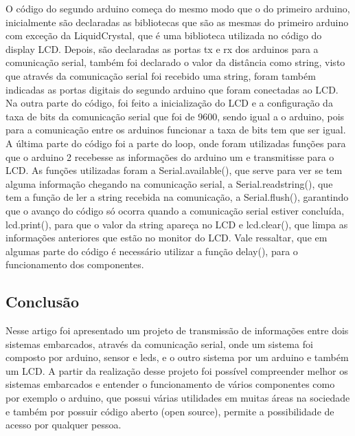 \documentclass[conference]{IEEEtran}
\begin{document}
O código do segundo arduino começa do mesmo modo que o do primeiro arduino, inicialmente são declaradas as bibliotecas que são as mesmas do primeiro arduino com exceção da 
LiquidCrystal, que é uma biblioteca utilizada no código do display LCD.
Depois, são declaradas as portas tx e rx dos arduinos para a comunicação serial, também foi declarado o valor da distância como string, visto que através
da comunicação serial foi recebido uma string, foram também indicadas as portas digitais do segundo arduino que foram conectadas ao LCD.
Na outra parte do código, foi feito a inicialização do LCD e a configuração da taxa de bits da comunicação serial que foi de 9600, sendo igual a o arduino, pois para a comunicação
entre os arduinos funcionar a taxa de bits tem que ser igual.
A última parte do código foi a parte do loop, onde foram utilizadas funções para que o arduino 2 recebesse as informações do arduino um e transmitisse para o LCD.
As funções utilizadas foram a Serial.available(), que serve para ver se tem alguma informação chegando na comunicação serial, a Serial.readstring(), que tem a função de ler
a string recebida na comunicação, a Serial.flush(), garantindo que o avanço do código só ocorra quando a comunicação serial estiver concluída, lcd.print(), para que o valor da string 
apareça no LCD e lcd.clear(), que limpa as informações anteriores que estão no monitor do LCD. Vale ressaltar, que em algumas parte do código é necessário utilizar a função 
delay(), para o funcionamento dos componentes.


\subsection{Conclusão}\label{SCM}

Nesse artigo foi apresentado um projeto de transmissão de informações entre dois sistemas embarcados, através da comunicação serial, onde um sistema
foi composto por arduino, sensor e leds, e o outro sistema por um arduino e também um LCD.
A partir da realização desse projeto foi possível compreender melhor os sistemas embarcados e entender o funcionamento de vários
componentes como por exemplo o arduino, que possui várias utilidades em muitas áreas na sociedade e também por possuir código aberto (open source), permite a possibilidade de acesso
por qualquer pessoa.  
\end{document}
